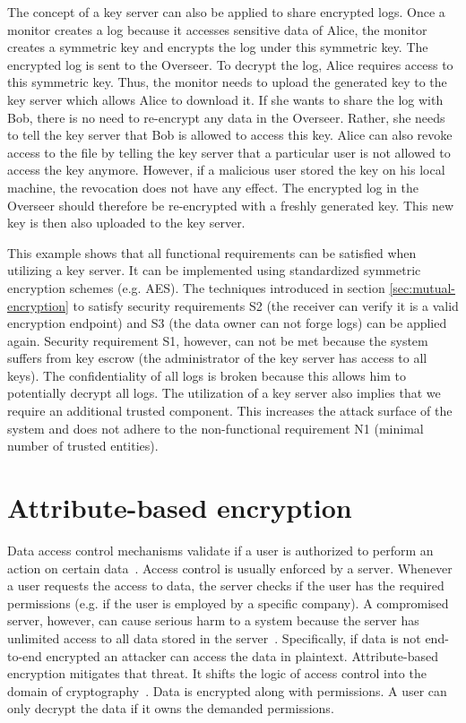 \documentclass[../main.tex]{subfiles}
\begin{document}
The concept of a key server can also be applied to share encrypted logs.
Once a monitor creates a log because it accesses sensitive data of Alice, the monitor creates a symmetric key and encrypts the log under this symmetric key.
The encrypted log is sent to the Overseer.
To decrypt the log, Alice requires access to this symmetric key.
Thus, the monitor needs to upload the generated key to the key server which allows Alice to download it.
If she wants to share the log with Bob, there is no need to re-encrypt any data in the Overseer.
Rather, she needs to tell the key server that Bob is allowed to access this key.
Alice can also revoke access to the file by telling the key server that a particular user is not allowed to access the key anymore.
However, if a malicious user stored the key on his local machine, the revocation does not have any effect.
The encrypted log in the Overseer should therefore be re-encrypted with a freshly generated key.
This new key is then also uploaded to the key server.

This example shows that all functional requirements can be satisfied when utilizing a key server.
It can be implemented using standardized symmetric encryption schemes (e.g. AES).
The techniques introduced in section \ref{sec:mutual-encryption} to satisfy security requirements S2 (the receiver can verify it is a valid encryption endpoint) and S3 (the data owner can not forge logs) can be applied again.
Security requirement S1, however, can not be met because the system suffers from key escrow (the administrator of the key server has access to all keys).
The confidentiality of all logs is broken because this allows him to potentially decrypt all logs.
The utilization of a key server also implies that we require an additional trusted component.
This increases the attack surface of the system and does not adhere to the non-functional requirement N1 (minimal number of trusted entities).

\section{Attribute-based encryption}
\label{sec:attribute-encryption}
Data access control mechanisms validate if a user is authorized to perform an action on certain data~\cite[242]{Eckert2018}.
Access control is usually enforced by a server.
Whenever a user requests the access to data, the server checks if the user has the required permissions (e.g. if the user is employed by a specific company).
A compromised server, however, can cause serious harm to a system because the server has unlimited access to all data stored in the server~\cite{Hagg2022}.
Specifically, if data is not end-to-end encrypted an attacker can access the data in plaintext.
Attribute-based encryption mitigates that threat.
It shifts the logic of access control into the domain of cryptography~\cite{Bethencourt2007}.
Data is encrypted along with permissions.
A user can only decrypt the data if it owns the demanded permissions.
\end{document}
